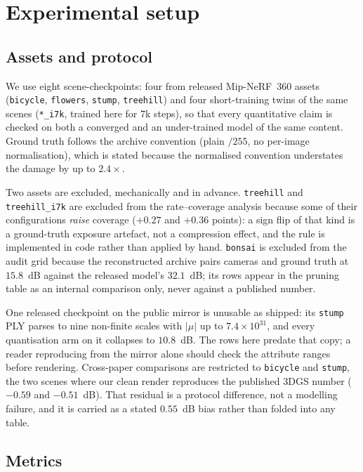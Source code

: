 \documentclass[preprint,number,3p]{elsarticle}
\begin{document}
\section{Experimental setup}
\label{sec:setup}

\subsection{Assets and protocol}
\label{sec:assets}

We use eight scene-checkpoints: four from released Mip-NeRF~360 assets (\texttt{bicycle}, \texttt{flowers},
\texttt{stump}, \texttt{treehill}) and four short-training twins of the same scenes (\texttt{*\_i7k}, trained here
for $7$k steps), so that every quantitative claim is checked on both a converged and an under-trained model of the
same content. Ground truth follows the archive convention (plain $/255$, no per-image normalisation), which is stated
because the normalised convention understates the damage by up to $2.4\times$.

Two assets are excluded, mechanically and in advance. \texttt{treehill} and \texttt{treehill\_i7k} are excluded from
the rate--coverage analysis because some of their configurations \emph{raise} coverage ($+0.27$ and $+0.36$
points): a sign flip of that kind is a ground-truth exposure artefact, not a compression effect, and the rule is
implemented in code rather than applied by hand. \texttt{bonsai} is excluded from the audit grid because the
reconstructed archive pairs cameras and ground truth at $15.8$~dB against the released model's $32.1$~dB; its rows
appear in the pruning table as an internal comparison only, never against a published number.

One released checkpoint on the public mirror is unusable as shipped: its \texttt{stump} PLY parses to nine
non-finite scales with $|\mu|$ up to $7.4\times10^{31}$, and every quantisation arm on it collapses to
$10.8$~dB. The rows here predate that copy; a reader reproducing from the mirror alone should check the
attribute ranges before rendering. Cross-paper comparisons are restricted to \texttt{bicycle} and \texttt{stump}, the two scenes where our clean render
reproduces the published 3DGS number ($-0.59$ and $-0.51$~dB). That residual is a protocol difference, not a
modelling failure, and it is carried as a stated $0.55$~dB bias rather than folded into any table.

\subsection{Metrics}
\label{sec:metrics}
\end{document}
